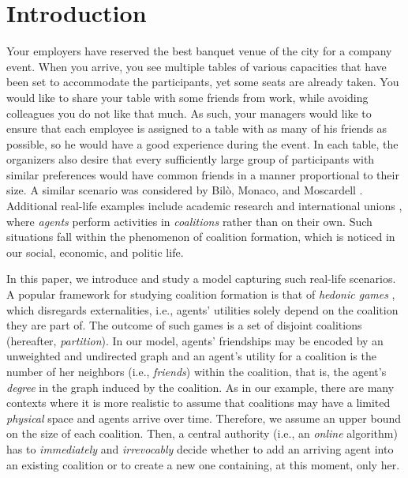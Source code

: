 \documentclass[letterpaper]{article} %
\begin{document}
\section{Introduction}
\label{sec:intro}
Your employers have reserved the best banquet venue of the city for a company event. When you arrive, you see multiple tables of various capacities that have been set to accommodate the participants, yet some seats are already taken. You would like to share your table with some friends from work, while avoiding colleagues you do not like that much. As such, your managers would like to ensure that each employee is assigned to a table with as many of his friends as possible, so he would have a good experience during the event. In each table, the organizers also desire that every sufficiently large group of participants with similar preferences would have common friends in a manner proportional to their size. A similar scenario was considered by Bil{\`o}, Monaco, and Moscardell . Additional real-life examples include academic research \cite{alcalde2004researching} and international unions \cite{hosli2001coalition}, where \textit{agents} perform activities in \textit{coalitions} rather than on their own. Such situations fall within the phenomenon of coalition formation, which is noticed in our social, economic, and politic life.
%

In this paper, we introduce and study a model capturing such real-life scenarios. A popular framework for studying coalition formation is that of \textit{hedonic games} \cite{dreze1980hedonic}, which disregards externalities, i.e., agents’ utilities solely depend on the coalition they are part of. The outcome of such games is a set of disjoint coalitions (hereafter, \textit{partition}). In our model, agents' friendships may be encoded by an unweighted and undirected graph and an agent's utility for a coalition is the number of her neighbors (i.e., \textit{friends}) within the coalition, that is, the agent's \textit{degree} in the graph induced by the coalition. %
As in our example, there are many contexts where it is more realistic to assume that coalitions may have a limited \textit{physical} space and agents arrive over time. Therefore, we assume an upper bound on the size of each coalition. Then, a central authority (i.e., an \textit{online} algorithm) has to \textit{immediately} and \textit{irrevocably} decide whether to add an arriving agent into an existing coalition or to create a new one containing, at this moment, only her.
\end{document}
